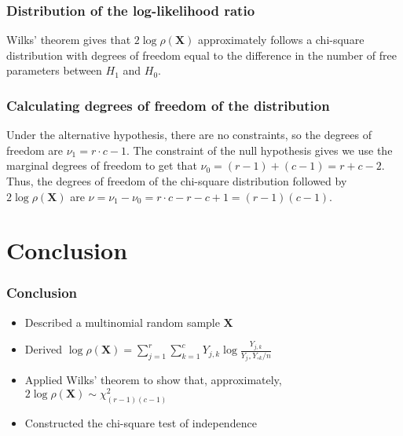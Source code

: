 \documentclass{beamer}
\begin{document}
\begin{frame}
	\frametitle{Distribution of the log-likelihood ratio}
	Wilks' theorem gives that $2\log\rho(\textbf{X})$ approximately follows a chi-square distribution with degrees of freedom equal to the difference in the number of free parameters between $H_1$ and $H_0$.
\end{frame}

\begin{frame}
	\frametitle{Calculating degrees of freedom of the distribution}
	Under the alternative hypothesis, there are no constraints, so the degrees of freedom are $\nu_1 = r\cdot c-1$. 
	\vskip0.2in
	The constraint of the null hypothesis gives we use the marginal degrees of freedom to get that $\nu_0 = (r-1) + (c-1) = r + c - 2$.
	\vskip0.2in
	Thus, the degrees of freedom of the chi-square distribution followed by $2\log\rho(\textbf{X})$ are $\nu = \nu_1 - \nu_0 = r\cdot c - r - c + 1 = (r-1)(c-1)$.
\end{frame}

\section{Conclusion}

\begin{frame}
\frametitle{Conclusion}
\begin{itemize}
	\item Described a multinomial random sample $\textbf{X}$
	\item Derived $\log\rho(\textbf{X}) = \sum_{j=1}^r\sum_{k=1}^cY_{j,k}\log\frac{Y_{j,k}}{Y_{j\circ}Y_{\circ k}/n}$
	\item Applied Wilks' theorem to show that, approximately, $2\log\rho(\textbf{X})\sim\chi^2_{(r-1)(c-1)}$
	\item Constructed the chi-square test of independence
\end{itemize}
	
\end{frame}
\end{document}

